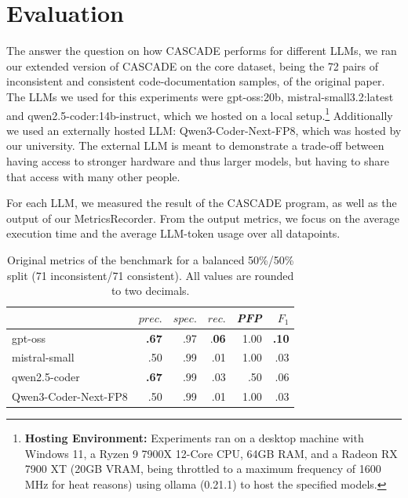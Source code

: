 \section{Evaluation}
\label{sec:evaluation}



The answer the question on how CASCADE performs for different LLMs, we ran our extended version of CASCADE on the core dataset, being the 72 pairs of inconsistent and consistent code-documentation samples, of the original paper.
The LLMs we used for this experiments were gpt-oss:20b\cite{ollama_gpt_oss_20b}, mistral-small3.2:latest\cite{ollama_mistral-small3.2_24b} and qwen2.5-coder:14b-instruct\cite{ollama_qwen2.5-coder-14b-instruct}, which we hosted on a local setup.\footnote{
\textbf{Hosting Environment:} Experiments ran on a desktop machine with Windows 11, a Ryzen 9 7900X 12-Core CPU, 64GB RAM, and a Radeon RX 7900 XT (20GB VRAM, being throttled to a maximum frequency of 1600 MHz for heat reasons) using ollama (0.21.1) to host the specified models.}
Additionally we used an externally hosted LLM: Qwen3-Coder-Next-FP8\cite{qwen_qwen3_coder_next_tech_report}, which was hosted by our university.
The external LLM is meant to demonstrate a trade-off between having access to stronger hardware and thus larger models, but having to share that access with many other people.

For each LLM, we measured the result of the CASCADE program, as well as the output of our MetricsRecorder. From the output metrics, we focus on the average execution time and the average LLM-token usage over all datapoints.

\begin{table}
   \centering
   \caption{Original metrics of the benchmark for a balanced 50\%/50\% split (71 inconsistent/71 consistent). All values are rounded to two decimals.}\label{tab:results}
\begin{tabular}{@{}lrrrrr@{}}
\toprule
 & $prec.$ & $spec.$ & $rec.$ & \textit{PFP} & $F_1$ \\ \midrule
gpt-oss & \textbf{.67} & .97 & .\textbf{06} & 1.00 & \textbf{.10} \\
mistral-small & .50 & .99 & .01 & 1.00 & .03 \\
qwen2.5-coder & \textbf{.67} & .99 & .03 & .50 & .06 \\
Qwen3-Coder-Next-FP8 & .50 & .99 & .01 & 1.00 & .03 \\
\bottomrule
\end{tabular}
\end{table}

